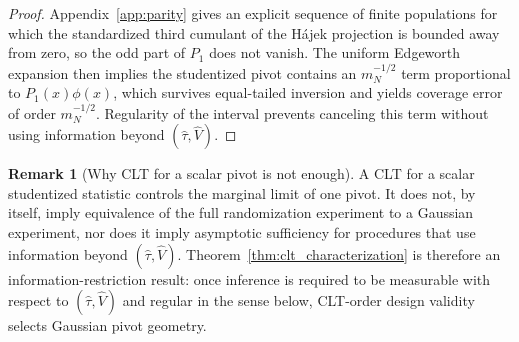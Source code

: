 \documentclass[aos]{imsart}
\theoremstyle{definition}
\newtheorem{remark}{Remark}
\theoremstyle{plain}
\newcommand{\mN}{m_N}
\begin{document}
\begin{proof}
Appendix~\ref{app:parity} gives an explicit sequence of finite populations for which the standardized third cumulant of the
Hájek projection is bounded away from zero, so the odd part of $P_1$ does not vanish. The uniform Edgeworth expansion then
implies the studentized pivot contains an $\mN^{-1/2}$ term proportional to $P_1(x)\phi(x)$, which survives equal-tailed
inversion and yields coverage error of order $\mN^{-1/2}$. Regularity of the interval prevents canceling this term
without using information beyond $(\hat\tau,\hat V)$.
\end{proof}

\begin{remark}[Why CLT for a scalar pivot is not enough]\label{rem:not_clt_equiv}
A CLT for a scalar studentized statistic controls the marginal limit of one pivot. It does not, by itself, imply equivalence of the full randomization experiment to a Gaussian experiment, nor does it imply asymptotic sufficiency for procedures that use information beyond $(\hat\tau,\hat V)$. Theorem~\ref{thm:clt_characterization} is therefore an information-restriction result: once inference is required to be measurable with respect to $(\hat\tau,\hat V)$ and regular in the sense below, CLT-order design validity selects Gaussian pivot geometry.
\end{remark}
\end{document}
